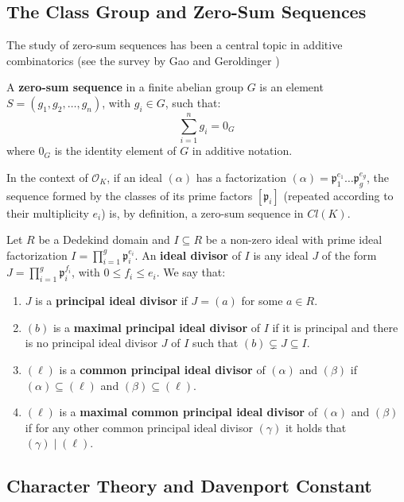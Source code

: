 \documentclass[11pt]{article}
\theoremstyle{definition}
\begin{document}
\subsection{The Class Group and Zero-Sum Sequences}

The study of zero-sum sequences has been a central topic in additive combinatorics (see the survey by Gao and Geroldinger \cite{GG06})


A \textbf{zero-sum sequence} in a finite abelian  group $G$ is an element $S = (g_1, g_2, \dots, g_n)$, with $g_i \in G$, such that:
\begin{equation}
    \sum_{i=1}^{n} g_i = 0_G
\end{equation}
where $0_G$ is the identity element of $G$ in additive notation.


In the context of $\mathcal{O}_K$, if an ideal $(\alpha)$ has a factorization $(\alpha) = \mathfrak{p}_1^{e_1} \dots \mathfrak{p}_g^{e_g}$, the sequence formed by the classes of its prime factors $[\mathfrak{p}_i]$ (repeated according to their multiplicity $e_i$) is, by definition, a zero-sum sequence in $Cl(K)$.


Let $R$ be a Dedekind domain and $I \subseteq R$ be a non-zero ideal with prime ideal factorization $I = \prod_{i=1}^{g} \mathfrak{p}_i^{e_i}$. An \textbf{ideal divisor} of $I$ is any ideal $J$ of the form $J = \prod_{i=1}^{g} \mathfrak{p}_i^{f_i}$, with $0 \le f_i \le e_i$. We say that:
\begin{enumerate}
    \item $J$ is a \textbf{principal ideal divisor} if $J = (a)$ for some $a \in R$.
    \item $(b)$ is a \textbf{maximal principal ideal divisor} of $I$ if it is principal and there is no principal ideal divisor $J$ of $I$ such that $(b) \subsetneq J \subseteq I$.
    \item $(\ell)$ is a \textbf{common principal ideal divisor} of $(\alpha)$ and $(\beta)$ if $(\alpha)\subseteq(\ell)$ and $(\beta)\subseteq(\ell)$.
    \item $(\ell)$ is a \textbf{maximal common principal ideal divisor} of $(\alpha)$ and $(\beta)$ if for any other common principal ideal divisor $(\gamma)$ it holds that $(\gamma) \mid (\ell)$.
\end{enumerate}


\subsection{Character Theory and Davenport Constant}
\end{document}
